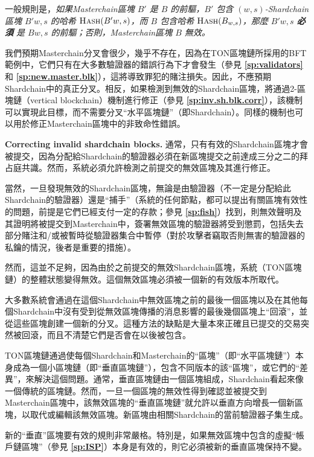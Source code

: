 \documentclass[12pt,oneside]{article}
\def\makepoint#1{\medbreak\noindent{\bf #1.\ }}
\def\nxsubpoint{\refstepcounter{subsubsection}%
  \smallbreak\makepoint{\thesubsubsection}}
\def\refpoint#1{{\rm\textbf{\ref{#1}}}}
\let\ptref=\refpoint
\def\embt(#1.){\textbf{#1.}}
\def\opsc#1{\operatorname{\textsc{#1}}}
\def\Hash{\opsc{Hash}}
\begin{document}
一般規則是，{\em 如果Masterchain區塊 $B'$ 是 $B$ 的前驅，$B'$ 包含 $(w,s)$-Shardchain區塊 $B'{w,s}$ 的哈希 $\Hash(B'{w,s})$，而 $B$ 包含哈希 $\Hash(B_{w,s})$，那麼 $B'{w,s}$ {\bf 必須} 是 $B{w,s}$ 的前驅；否則，Masterchain區塊 $B$ 無效。}

我們預期Masterchain分叉會很少，幾乎不存在，因為在TON區塊鏈所採用的BFT範例中，它們只有在大多數驗證器的錯誤行為下才會發生（參見 \ptref{sp:validators} 和 \ptref{sp:new.master.blk}），這將導致罪犯的賭注損失。因此，不應預期Shardchain中的真正分叉。相反，如果檢測到無效的Shardchain區塊，將通過2-區塊鏈（vertical blockchain）機制進行修正（參見 \ptref{sp:inv.sh.blk.corr}），該機制可以實現此目標，而不需要分叉“水平區塊鏈”（即Shardchain）。同樣的機制也可以用於修正Masterchain區塊中的非致命性錯誤。

\nxsubpoint\label{sp:inv.sh.blk.corr} \embt(Correcting invalid
shardchain blocks.)  通常，只有有效的Shardchain區塊才會被提交，因為分配給Shardchain的驗證器必須在新區塊提交之前達成三分之二的拜占庭共識。然而，系統必須允許檢測之前提交的無效區塊及其進行修正。

當然，一旦發現無效的Shardchain區塊，無論是由驗證器（不一定是分配給此Shardchain的驗證器）還是“捕手”（系統的任何節點，都可以提出有關區塊有效性的問題，前提是它們已經支付一定的存款；參見 \ptref{sp:fish}）找到，則無效聲明及其證明將被提交到Masterchain中，簽署無效區塊的驗證器將受到懲罰，包括失去部分賭注和/或被暫時從驗證器集合中暫停（對於攻擊者竊取否則無害的驗證器的私鑰的情況，後者是重要的措施）。

然而，這並不足夠，因為由於之前提交的無效Shardchain區塊，系統（TON區塊鏈）的整體狀態變得無效。這個無效區塊必須被一個新的有效版本所取代。

大多數系統會通過在這個Shardchain中無效區塊之前的最後一個區塊以及在其他每個Shardchain中沒有受到從無效區塊傳播的消息影響的最後幾個區塊上“回滾”，並從這些區塊創建一個新的分叉。這種方法的缺點是大量本來正確且已提交的交易突然被回滾，而且不清楚它們是否會在以後被包含。

TON區塊鏈通過使每個Shardchain和Masterchain的“區塊”（即“水平區塊鏈”）本身成為一個小區塊鏈（即“垂直區塊鏈”），包含不同版本的該“區塊”，或它們的“差異”，來解決這個問題。通常，垂直區塊鏈由一個區塊組成，Shardchain看起來像一個傳統的區塊鏈。然而，一旦一個區塊的無效性得到確認並被提交到Masterchain區塊中，該無效區塊的“垂直區塊鏈”就允許以垂直方向增長一個新區塊，以取代或編輯該無效區塊。新區塊由相關Shardchain的當前驗證器子集生成。

新的“垂直”區塊要有效的規則非常嚴格。特別是，如果無效區塊中包含的虛擬“帳戶鏈區塊”（參見 \ptref{sp:ISP}）本身是有效的，則它必須被新的垂直區塊保持不變。
\end{document}
